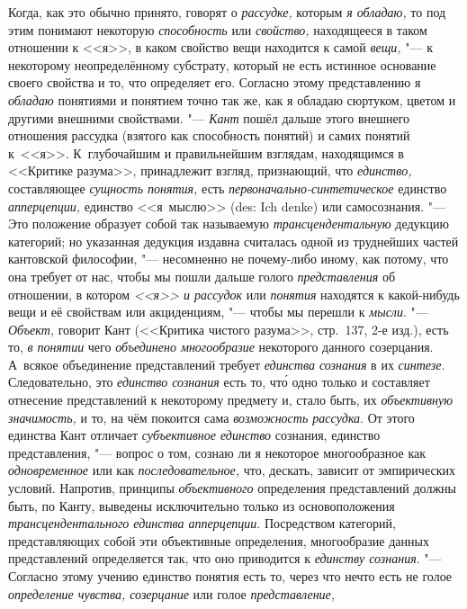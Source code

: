 Когда, как это обычно принято, говорят о {\em рассудке,} которым
{\em я обладаю,} то под этим понимают некоторую {\em способность} или
{\em свойство,} находящееся в таком отношении к <<я>>, в каком свойство вещи
находится к самой {\em вещи,} "--- к некоторому неопределённому субстрату,
который не есть истинное основание
своего свойства и то, что определяет его. Согласно этому представлению я
{\em обладаю} понятиями и понятием точно так же, как я обладаю сюртуком,
цветом и другими внешними свойствами. "--- {\em Кант} пошёл дальше этого
внешнего отношения рассудка (взятого как способность понятий) и самих
понятий к~<<я>>. К~глубочайшим и правильнейшим взглядам, находящимся в
<<Критике разума>>, принадлежит взгляд, признающий, что {\em единство,}
составляющее {\em сущность понятия,} есть {\em первоначально-синтетическое}
единство {\em апперцепции,} единство <<я~мыслю>> (des: Ich denke) или
самосознания. "---
Это положение образует собой так называемую {\em трансцендентальную} дедукцию
категорий; но указанная дедукция издавна считалась одной из труднейших
частей кантовской философии, "--- несомненно не почему-либо иному, как потому,
что она требует от нас, чтобы мы пошли дальше голого {\em представления} об
отношении, в котором {\em <<я>> и рассудок} или {\em понятия} находятся к
какой-нибудь вещи и её свойствам или акциденциям, "--- чтобы мы перешли к
{\em мысли}. "--- {\em Объект,} говорит Кант (<<Критика чистого разума>>,
стр.~137, 2-е изд.), есть то, {\em в понятии} чего {\em объединено многообразие}
некоторого данного созерцания. А~всякое объединение представлений требует
{\em единства сознания} в их {\em синтезе}. Следовательно, это {\em единство сознания}
есть то, чт\'{о} одно только и составляет отнесение представлений к некоторому
предмету и, стало быть, их {\em объективную значимость,} и то, на чём покоится
сама {\em возможность рассудка}. От этого единства Кант отличает
{\em субъективное единство} сознания, единство представления, "--- вопрос о том,
сознаю ли я некоторое многообразное как {\em одновременное} или как
{\em последовательное,} что, дескать, зависит от эмпирических условий.
Напротив, принципы {\em объективного} определения представлений должны быть,
по Канту, выведены исключительно только из основоположения
{\em трансцендентального единства апперцепции}. Посредством категорий,
представляющих собой эти объективные определения, многообразие данных
представлений определяется так, что оно приводится к {\em единству сознания}.
"--- Согласно этому учению единство понятия есть то, через что нечто есть не
голое {\em определение чувства, созерцание} или голое {\em представление,}
